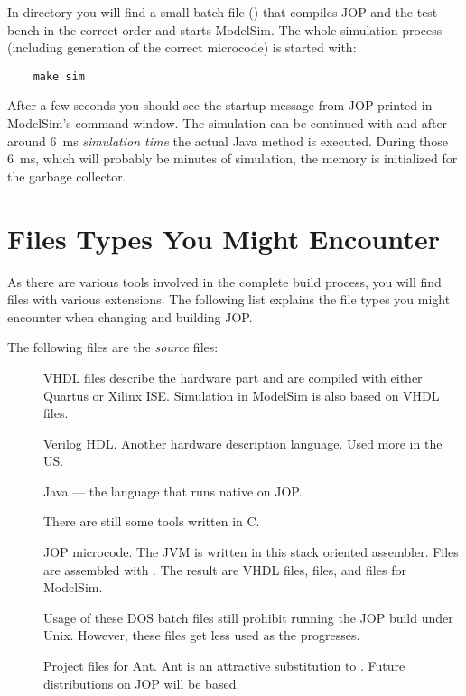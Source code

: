In directory  you will find a small batch file
() that compiles JOP and the test bench in the correct
order and starts ModelSim. The whole simulation process (including
generation of the correct microcode) is started with:

\begin{lstlisting}
    make sim
\end{lstlisting}

After a few seconds you should see the startup message from JOP
printed in ModelSim's command window. The simulation can be continued
with  and after around 6~ms \emph{simulation time} the
actual Java  method is executed. During those 6~ms,
which will probably be minutes of simulation, the memory is
initialized for the garbage collector.

\section{Files Types You Might Encounter}

As there are various tools involved in the complete build process,
you will find files with various extensions. The following list
explains the file types you might encounter when changing and
building JOP.

The following files are the \emph{source} files:

\begin{description}

\item[] VHDL files describe the hardware part and are
compiled with either Quartus or Xilinx ISE. Simulation in ModelSim
is also based on VHDL files.
\item[] Verilog HDL. Another hardware description language.
Used more in the US.

\item[] Java --- the language that runs native on JOP.

\item[] There are still some tools written in C.

\item[] JOP microcode. The JVM is written in this stack
oriented assembler. Files are assembled with . The result
are VHDL files,  files, and  files for
ModelSim.

\item[] Usage of these DOS batch files still prohibit
running the JOP build under Unix. However, these files get less used
as the  progresses.

\item[] Project files for Ant. Ant is an attractive
substitution to . Future distributions on JOP will be
 based.

\end{description}


